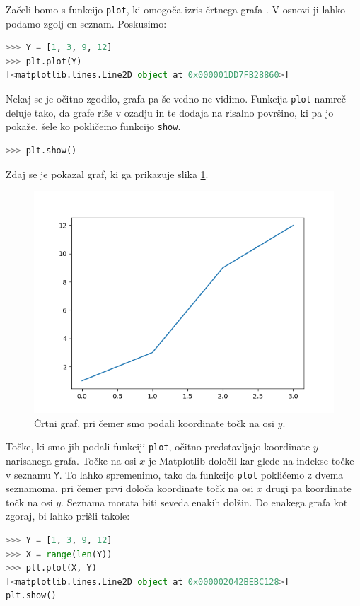 Začeli bomo s funkcijo \texttt{plot}, ki omogoča izris črtnega grafa . V osnovi ji lahko podamo zgolj en seznam. Poskusimo:
\begin{lstlisting}[language=Python, showstringspaces=false]
>>> Y = [1, 3, 9, 12]
>>> plt.plot(Y)
[<matplotlib.lines.Line2D object at 0x000001DD7FB28860>]
\end{lstlisting}
Nekaj se je očitno zgodilo, grafa pa še vedno ne vidimo. Funkcija \texttt{plot} namreč deluje tako, da grafe riše v ozadju in te dodaja na risalno površino, ki pa jo pokaže, šele ko pokličemo funkcijo \texttt{show}.
\begin{lstlisting}[language=Python, showstringspaces=false]
>>> plt.show()
\end{lstlisting}
Zdaj se je pokazal graf, ki ga prikazuje slika \ref{img:plt1}.
\begin{figure}
    \includegraphics[width=\linewidth]{img/plt1.png}
    \caption{Črtni graf, pri čemer smo podali koordinate točk na osi $y$.}
    \label{img:plt1}
\end{figure}
Točke, ki smo jih podali funkciji \texttt{plot}, očitno predstavljajo koordinate $y$ narisanega grafa. Točke na osi $x$ je Matplotlib določil kar glede na indekse točke v seznamu \texttt{Y}. To lahko spremenimo, tako da funkcijo \texttt{plot} pokličemo z dvema seznamoma, pri čemer prvi določa koordinate točk na osi $x$ drugi pa koordinate točk na osi $y$. Seznama morata biti seveda enakih dolžin. Do enakega grafa kot zgoraj, bi lahko prišli takole: 
\begin{lstlisting}[language=Python, showstringspaces=false]
>>> Y = [1, 3, 9, 12]
>>> X = range(len(Y))
>>> plt.plot(X, Y)
[<matplotlib.lines.Line2D object at 0x000002042BEBC128>]
plt.show()
\end{lstlisting}
